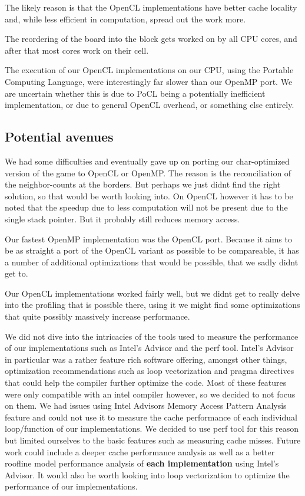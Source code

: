 \documentclass[a4paper,english,12pt,twoside=false]{scrartcl} %
\begin{document}
The likely reason is that the OpenCL implementations have better cache locality and, while less efficient in computation, spread out the work more.

The reordering of the board into the block gets worked on by all CPU cores, and after that most cores work on their cell.

The execution of our OpenCL implementations on our CPU, using the Portable Computing Language, were interestingly far slower than our OpenMP port.
We are uncertain whether this is due to PoCL being a potentially inefficient implementation, or due to general OpenCL overhead, or something else entirely.

\subsection{Potential avenues}

We had some difficulties and eventually gave up on porting our char-optimized version of the game to OpenCL or OpenMP. 
The reason is the reconciliation of the neighbor-counts at the borders.
But perhaps we just didnt find the right solution, so that would be worth looking into.
On OpenCL however it has to be noted that the speedup due to less computation will not be present due to the single stack pointer. 
But it probably still reduces memory access.

Our fastest OpenMP implementation was the OpenCL port.
Because it aims to be as straight a port of the OpenCL variant as possible to be compareable, 
it has a number of additional optimizations that would be possible, that we sadly didnt get to.

Our OpenCL implementations worked fairly well, but we didnt get to really delve into the profiling that is possible there, 
using it we might find some optimizations that quite possibly massively increase performance.

We did not dive into the intricacies of the tools used to measure the performance of our implementations such as
Intel's Advisor and the perf tool. Intel's Advisor in particular was a rather feature rich software offering, amongst other things,
optimization recommendations such as loop vectorization and pragma directives that could help the compiler further
optimize the code. Most of these features were only compatible with an intel compiler however, so we decided to not focus on them.
We had issues using Intel Advisors Memory Access Pattern Analysis feature and could not use it
to measure the cache performance of each individual loop/function of our implementations. We decided to use perf tool for this reason
but limited ourselves to the basic features such as measuring cache misses. Future work could include a deeper cache performance analysis
as well as a better roofline model performance analysis of \textbf{each implementation} using Intel's Advisor. It would also be worth looking
into loop vectorization to optimize the performance of our implementations. \breakln
\end{document}
